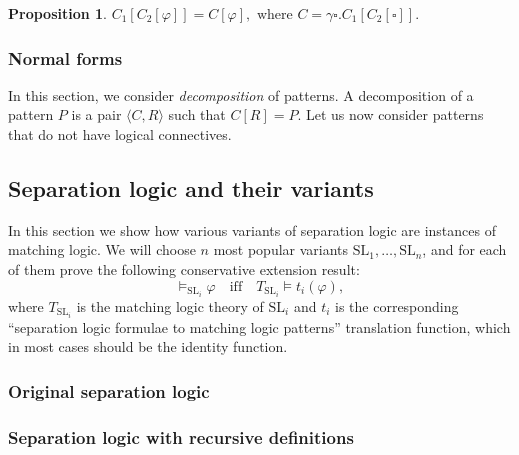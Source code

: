 \documentclass{article}
\theoremstyle{plain}
\newtheorem{prop}[thm]{Proposition}
\begin{document}
\begin{prop}
	$C_1[C_2[\varphi]] = C [\varphi], \text{ where } C = \gamma \square . C_1[C_2[\square]].$
\end{prop}

\subsubsection{Normal forms}

In this section, we consider \emph{decomposition} of patterns. A decomposition of a pattern $P$ is a pair $\langle C, R \rangle $ such that $C[R] = P$. Let us now consider patterns that do not have logical connectives.

\subsection{Separation logic and their variants}

In this section we show how various variants of separation logic are instances of matching logic. We will choose $n$ most popular variants $\mathrm{SL}_1, \dots, \mathrm{SL}_n$, and for each of them prove the following conservative extension result:
\begin{equation*}
\vDash_{\mathrm{SL}_i} \varphi \quad \text{iff} \quad T_{\mathrm{SL}_i} \vDash t_i(\varphi),
\end{equation*}
where $T_{\mathrm{SL}_i}$ is the matching logic theory of $\mathrm{SL}_i$ and $t_i$ is the corresponding ``separation logic formulae to matching logic patterns''  translation function, which in most cases should be the identity function.

\subsubsection{Original separation logic}

\subsubsection{Separation logic with recursive definitions}

\end{document}
